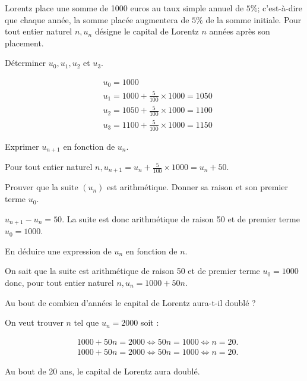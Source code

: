 \documentclass[11pt,a4paper]{article}  %
\begin{document}
Lorentz place une somme de 1000 euros au taux simple annuel de $5 \%$; c'est-à-dire que chaque année, la somme placée augmentera de $5 \%$ de la somme initiale. Pour tout entier naturel $n, u_n$ désigne le capital de Lorentz $n$ années après son placement.
\begin{enumMet}
	\item Déterminer $u_0, u_1, u_2$ et $u_3$.
	\begin{corrBox}
		$$
		\begin{aligned}
			& u_0=1000 \\
			& u_1=1000+\frac{5}{100} \times 1000=1050 \\
			& u_2=1050+\frac{5}{100} \times 1000=1100 \\
			& u_3=1100+\frac{5}{100} \times 1000=1150
		\end{aligned}
		$$	
	\end{corrBox}
	\item Exprimer $u_{n+1}$ en fonction de $u_n$.
	\begin{corrBox}
		Pour tout entier naturel $n, u_{n+1}=u_n+\frac{5}{100} \times 1000=u_n+50$.		
	\end{corrBox}
	\item Prouver que la suite $\left(u_n\right)$ est arithmétique. Donner sa raison et son premier terme $u_0$.
	\begin{corrBox}
		$u_{n+1}-u_n=50$. La suite est donc arithmétique de raison 50 et de premier terme $u_0=1000$.		
	\end{corrBox}
	\item En déduire une expression de $u_n$ en fonction de $n$.
	\begin{corrBox}
		On sait que la suite est arithmétique de raison 50 et de premier terme $u_0=1000$ donc, pour tout entier naturel $n, u_n=1000+50 n$.			
	\end{corrBox}
	\item Au bout de combien d'années le capital de Lorentz aura-t-il doublé ?
	\begin{corrBox}
		On veut trouver $n$ tel que $u_n=2000$ soit :
		
		$$
		\begin{aligned}
			& 1000+50 n=2000 \Longleftrightarrow 50 n=1000 \Longleftrightarrow n=20 . \\
			& 1000+50 n=2000 \Longleftrightarrow 50 n=1000 \Longleftrightarrow n=20 .
		\end{aligned}
		$$
		
		Au bout de 20 ans, le capital de Lorentz aura doublé.		
	\end{corrBox}
\end{enumMet}
\end{document}
